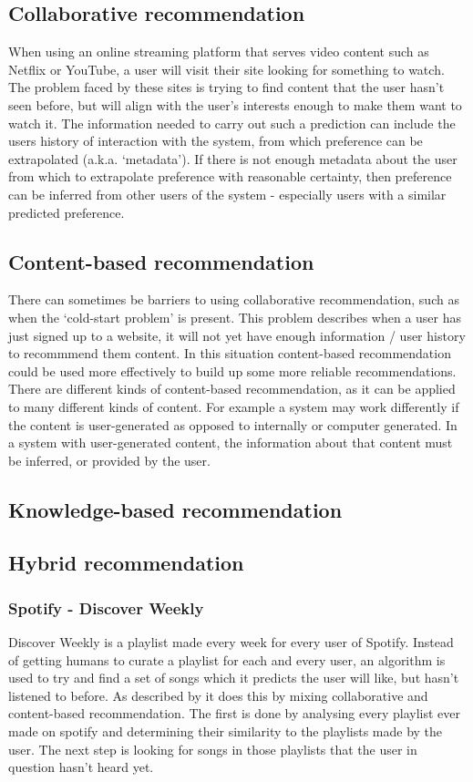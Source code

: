 \documentclass[a4paper,12pt]{article}
\begin{document}
  \subsection{Collaborative recommendation}
    When using an online streaming platform that serves video content such as Netflix or YouTube, a user will visit their site looking for something to watch. The problem faced by these sites is trying to find content that the user hasn't seen before, but will align with the user's interests enough to make them want to watch it.
    The information needed to carry out such a prediction can include the users history of interaction with the system, from which preference can be extrapolated (a.k.a. ‘metadata’). If there is not enough metadata about the user from which to extrapolate preference with reasonable certainty, then preference can be inferred from other users of the system - especially users with a similar predicted preference.

  \subsection{Content-based recommendation}
    There can sometimes be barriers to using collaborative recommendation, such as when the ‘cold-start problem’ is present. This problem describes when a user has just signed up to a website, it will not yet have enough information / user history to recommmend them content. %
    In this situation content-based recommendation could be used more effectively to build up some more reliable recommendations. %
    There are different kinds of content-based recommendation, as it can be applied to many different kinds of content. For example a system may work differently if the content is user-generated as opposed to internally or computer generated. In a system with user-generated content, the information about that content must be inferred, or provided by the user. %


  \subsection{Knowledge-based recommendation}

  \subsection{Hybrid recommendation}

    \subsubsection{Spotify - Discover Weekly}
      Discover Weekly is a playlist made every week for every user of Spotify. Instead of getting humans to curate a playlist for each and every user, an algorithm is used to try and find a set of songs which it predicts the user will like, but hasn't listened to before. As described by \cite{popper2015dw} it does this by mixing collaborative and content-based recommendation. The first is done by analysing every playlist ever made on spotify and determining their similarity to the playlists made by the user. The next step is looking for songs in those playlists that the user in question hasn't heard yet.
\end{document}
